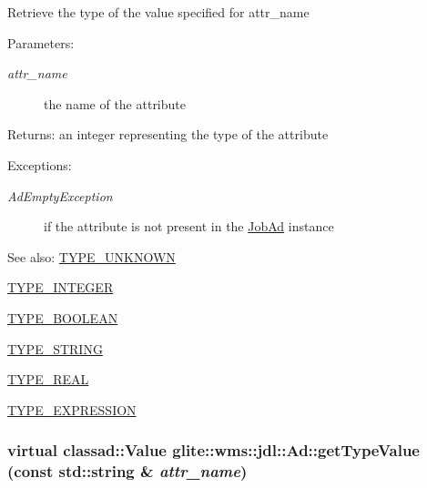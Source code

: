 Retrieve the type of the value specified for attr\_\-name \begin{Desc}
\item[Parameters:]
\begin{description}
\item[{\em attr\_\-name}]the name of the attribute \end{description}
\end{Desc}
\begin{Desc}
\item[Returns:]an integer representing the type of the attribute \end{Desc}
\begin{Desc}
\item[Exceptions:]
\begin{description}
\item[{\em Ad\-Empty\-Exception}]if the attribute is not present in the \hyperlink{classglite_1_1wms_1_1jdl_1_1JobAd}{Job\-Ad} instance \end{description}
\end{Desc}
\begin{Desc}
\item[See also:]\hyperlink{classglite_1_1wms_1_1jdl_1_1Ad_z19_0w0}{TYPE\_\-UNKNOWN} 

\hyperlink{classglite_1_1wms_1_1jdl_1_1Ad_z19_0w1}{TYPE\_\-INTEGER} 

\hyperlink{classglite_1_1wms_1_1jdl_1_1Ad_z19_0w2}{TYPE\_\-BOOLEAN} 

\hyperlink{classglite_1_1wms_1_1jdl_1_1Ad_z19_0w3}{TYPE\_\-STRING} 

\hyperlink{classglite_1_1wms_1_1jdl_1_1Ad_z19_0w4}{TYPE\_\-REAL} 

\hyperlink{classglite_1_1wms_1_1jdl_1_1Ad_z19_0w5}{TYPE\_\-EXPRESSION} \end{Desc}
\hypertarget{classglite_1_1wms_1_1jdl_1_1Ad_b4}{
\subsubsection[getTypeValue]{\setlength{\rightskip}{0pt plus 5cm}virtual classad::Value glite::wms::jdl::Ad::get\-Type\-Value (const std::string \& {\em attr\_\-name})}}
\label{classglite_1_1wms_1_1jdl_1_1Ad_b4}


